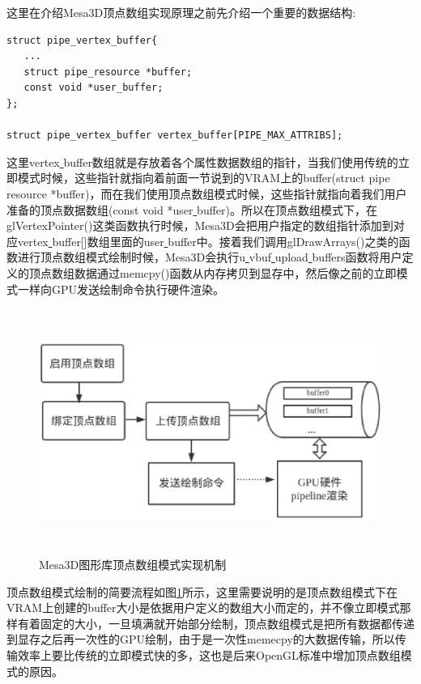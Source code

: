 这里在介绍Mesa3D顶点数组实现原理之前先介绍一个重要的数据结构:
\begin{lstlisting}
struct pipe_vertex_buffer{
   ...
   struct pipe_resource *buffer; 
   const void *user_buffer;
};

struct pipe_vertex_buffer vertex_buffer[PIPE_MAX_ATTRIBS];
\end{lstlisting}
这里vertex\underline{ }buffer数组就是存放着各个属性数据数组的指针，当我们使用传统的立即模式时候，这些指针就指向着前面一节说到的VRAM上的buffer(struct pipe\underline{ }resource *buffer)，而在我们使用顶点数组模式时候，这些指针就指向着我们用户准备的顶点数据数组(const void *user\underline{ }buffer)。所以在顶点数组模式下，在glVertexPointer()这类函数执行时候，Mesa3D会把用户指定的数组指针添加到对应vertex\underline{ }buffer[]数组里面的user\underline{ }buffer中。接着我们调用glDrawArrays()之类的函数进行顶点数组模式绘制时候，Mesa3D会执行u\underline{ }vbuf\underline{ }upload\underline{ }buffers函数将用户定义的顶点数组数据通过memcpy()函数从内存拷贝到显存中，然后像之前的立即模式一样向GPU发送绘制命令执行硬件渲染。

\begin{figure}[H] 
  \centering
  \includegraphics[width=12cm,height=8cm]{figures/chap03/vbo-flow}
  \caption{Mesa3D图形库顶点数组模式实现机制}
  \label{fig:vbo-flow}
\end{figure}

顶点数组模式绘制的简要流程如图\ref{fig:vbo-flow}所示，这里需要说明的是顶点数组模式下在VRAM上创建的buffer大小是依据用户定义的数组大小而定的，并不像立即模式那样有着固定的大小，一旦填满就开始部分绘制，顶点数组模式是把所有数据都传递到显存之后再一次性的GPU绘制，由于是一次性memecpy的大数据传输，所以传输效率上要比传统的立即模式快的多，这也是后来OpenGL标准中增加顶点数组模式的原因。


